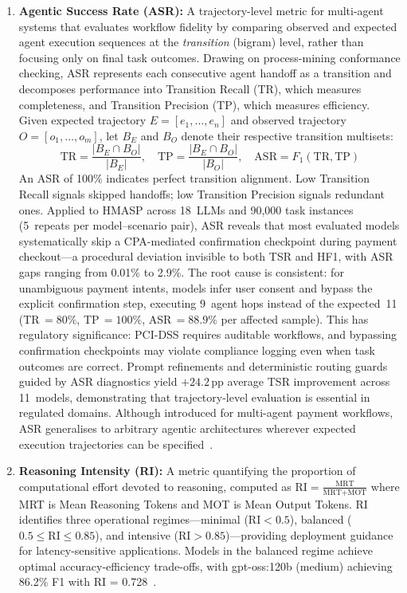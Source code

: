 \begin{enumerate}[leftmargin=*]
    \item \textbf{Agentic Success Rate (ASR):} A trajectory-level metric for multi-agent systems that evaluates workflow fidelity by comparing observed and expected agent execution sequences at the \emph{transition} (bigram) level, rather than focusing only on final task outcomes. Drawing on process-mining conformance checking, ASR represents each consecutive agent handoff as a transition and decomposes performance into Transition Recall (TR), which measures completeness, and Transition Precision (TP), which measures efficiency. Given expected trajectory $E = [e_1, \ldots, e_n]$ and observed trajectory $O = [o_1, \ldots, o_m]$, let $B_E$ and $B_O$ denote their respective transition multisets:
    \[
    \text{TR} = \frac{|B_E \cap B_O|}{|B_E|}, \quad
    \text{TP} = \frac{|B_E \cap B_O|}{|B_O|}, \quad
    \text{ASR} = F_1(\text{TR}, \text{TP})
    \]
    An ASR of 100\% indicates perfect transition alignment. Low Transition Recall signals skipped handoffs; low Transition Precision signals redundant ones. Applied to HMASP across 18~LLMs and 90{,}000 task instances (5~repeats per model--scenario pair), ASR reveals that most evaluated models systematically skip a CPA-mediated confirmation checkpoint during payment checkout---a procedural deviation invisible to both TSR and HF1, with ASR gaps ranging from 0.01\% to 2.9\%. The root cause is consistent: for unambiguous payment intents, models infer user consent and bypass the explicit confirmation step, executing 9~agent hops instead of the expected~11 (TR\,$= 80\%$, TP\,$= 100\%$, ASR\,$= 88.9\%$ per affected sample). This has regulatory significance: PCI-DSS requires auditable workflows, and bypassing confirmation checkpoints may violate compliance logging even when task outcomes are correct. Prompt refinements and deterministic routing guards guided by ASR diagnostics yield $+24.2$\,pp average TSR improvement across 11~models, demonstrating that trajectory-level evaluation is essential in regulated domains. Although introduced for multi-agent payment workflows, ASR generalises to arbitrary agentic architectures wherever expected execution trajectories can be specified~\cite{huang2026asr,huang2026hmasp}.
    
    \item \textbf{Reasoning Intensity (RI):} A metric quantifying the proportion of computational effort devoted to reasoning, computed as $\text{RI} = \frac{\text{MRT}}{\text{MRT} + \text{MOT}}$ where MRT is Mean Reasoning Tokens and MOT is Mean Output Tokens. RI identifies three operational regimes---minimal ($\text{RI} < 0.5$), balanced ($0.5 \leq \text{RI} \leq 0.85$), and intensive ($\text{RI} > 0.85$)---providing deployment guidance for latency-sensitive applications. Models in the balanced regime achieve optimal accuracy-efficiency trade-offs, with gpt-oss:120b (medium) achieving 86.2\% F1 with RI = 0.728~\cite{huang2025reasoning_deployment}.
    

\end{enumerate}
